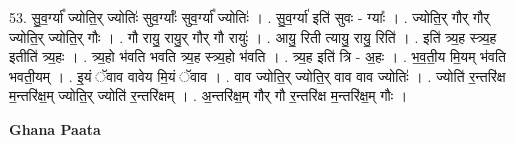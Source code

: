 \documentclass[17pt]{extarticle}
\begin{document}
53. सु॒व॒र्ग्या᳚ ज्योति॒र् ज्योतिः॑ सुव॒र्ग्याः᳚ सुव॒र्ग्या᳚ ज्योतिः॑ । . सु॒व॒र्ग्या॑ इति॑ सुवः - ग्याः᳚ । . ज्योति॒र् गौर् गौर् ज्योति॒र् ज्योति॒र् गौः । . गौ रायु॒ रायु॒र् गौर् गौ रायुः॑ । . आयु॒ रिती त्यायु॒ रायु॒ रिति॑ । . इति॑ त्र्य॒ह स्त्र्य॒ह इतीति॑ त्र्य॒हः । . त्र्य॒हो भ॑वति भवति त्र्य॒ह स्त्र्य॒हो भ॑वति । . त्र्य॒ह इति॑ त्रि - अ॒हः । . भ॒व॒ती॒य मि॒यम् भ॑वति भवती॒यम् । . इ॒यं ॅवाव वावेय मि॒यं ॅवाव । . वाव ज्योति॒र् ज्योति॒र् वाव वाव ज्योतिः॑ । . ज्योति॑ र॒न्तरि॑क्ष म॒न्तरि॑क्ष॒म् ज्योति॒र् ज्योति॑ र॒न्तरि॑क्षम् । . अ॒न्तरि॑क्ष॒म् गौर् गौ र॒न्तरि॑क्ष म॒न्तरि॑क्ष॒म् गौः । \newline

\textbf{Ghana Paata } \newline
\end{document}
